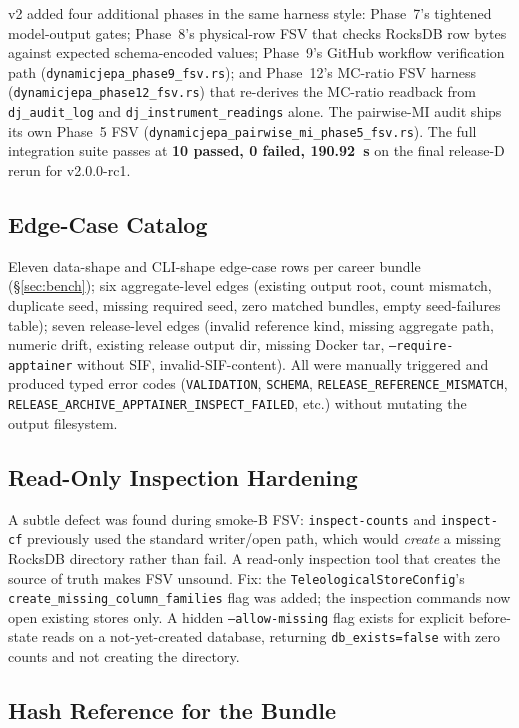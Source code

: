 \documentclass[10pt,twocolumn,letterpaper]{article}
\newcommand{\code}[1]{\texttt{\small #1}}
\begin{document}
v2 added four additional phases in the same harness style:
Phase~7's tightened model-output gates; Phase~8's physical-row FSV
that checks RocksDB row bytes against expected schema-encoded
values; Phase~9's GitHub workflow verification path
(\code{dynamicjepa\_phase9\_fsv.rs}); and Phase~12's MC-ratio FSV
harness (\code{dynamicjepa\_phase12\_fsv.rs}) that re-derives the
MC-ratio readback from \code{dj\_audit\_log} and
\code{dj\_instrument\_readings} alone. The pairwise-MI audit ships
its own Phase~5 FSV
(\code{dynamicjepa\_pairwise\_mi\_phase5\_fsv.rs}). The full
integration suite passes at \textbf{10 passed, 0 failed,
190.92~s} on the final release-D rerun for v2.0.0-rc1.

\subsection{Edge-Case Catalog}

Eleven data-shape and CLI-shape edge-case rows per career bundle
(\S\ref{sec:bench}); six aggregate-level edges (existing output
root, count mismatch, duplicate seed, missing required seed, zero
matched bundles, empty seed-failures table); seven release-level
edges (invalid reference kind, missing aggregate path, numeric
drift, existing release output dir, missing Docker tar,
\code{--require-apptainer} without SIF, invalid-SIF-content). All
were manually triggered and produced typed error codes
(\code{VALIDATION}, \code{SCHEMA},
\code{RELEASE\_REFERENCE\_MISMATCH},
\code{RELEASE\_ARCHIVE\_APPTAINER\_INSPECT\_FAILED}, etc.) without
mutating the output filesystem.

\subsection{Read-Only Inspection Hardening}

A subtle defect was found during smoke-B FSV: \code{inspect-counts}
and \code{inspect-cf} previously used the standard writer/open
path, which would \emph{create} a missing RocksDB directory rather
than fail. A read-only inspection tool that creates the source of
truth makes FSV unsound. Fix: the
\code{TeleologicalStoreConfig}'s
\code{create\_missing\_column\_families} flag was added; the
inspection commands now open existing stores only. A hidden \code{--allow-missing} flag exists for explicit
before-state reads on a not-yet-created database, returning
\code{db\_exists=false} with zero counts and not creating the
directory.

\subsection{Hash Reference for the Bundle}
\end{document}
